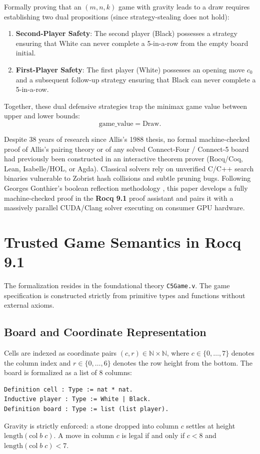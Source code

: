 \documentclass[11pt,reqno]{amsart}
\theoremstyle{plain}
\theoremstyle{definition}
\theoremstyle{remark}
\begin{document}
Formally proving that an $(m, n, k)$ game with gravity leads to a draw requires establishing two dual propositions (since strategy-stealing does not hold):
\begin{enumerate}
    \item \textbf{Second-Player Safety}: The second player (Black) possesses a strategy ensuring that White can never complete a 5-in-a-row from the empty board $\text{initial}$.
    \item \textbf{First-Player Safety}: The first player (White) possesses an opening move $c_0$ and a subsequent follow-up strategy ensuring that Black can never complete a 5-in-a-row.
\end{enumerate}
Together, these dual defensive strategies trap the minimax game value between upper and lower bounds:
\begin{equation}
\label{eq:game_value_draw}
\text{game\_value} = \text{Draw}.
\end{equation}

Despite 38 years of research since Allis's 1988 thesis, no formal machine-checked proof of Allis's pairing theory or of any solved Connect-Four / Connect-5 board had previously been constructed in an interactive theorem prover (Rocq/Coq, Lean, Isabelle/HOL, or Agda). Classical solvers rely on unverified C/C++ search binaries vulnerable to Zobrist hash collisions and subtle pruning bugs. Following Georges Gonthier's boolean reflection methodology \cite{gonthier2008formal}, this paper develops a fully machine-checked proof in the \textbf{Rocq 9.1} proof assistant and pairs it with a massively parallel CUDA/Clang solver executing on consumer GPU hardware.

\section{Trusted Game Semantics in Rocq 9.1}

The formalization resides in the foundational theory \texttt{C5Game.v}. The game specification is constructed strictly from primitive types and functions without external axioms.

\subsection{Board and Coordinate Representation}
Cells are indexed as coordinate pairs $(c, r) \in \mathbb{N} \times \mathbb{N}$, where $c \in \{0, \dots, 7\}$ denotes the column index and $r \in \{0, \dots, 6\}$ denotes the row height from the bottom. The board is formalized as a list of 8 columns:
\begin{lstlisting}[language=Coq]
Definition cell : Type := nat * nat.
Inductive player : Type := White | Black.
Definition board : Type := list (list player).
\end{lstlisting}
Gravity is strictly enforced: a stone dropped into column $c$ settles at height $\text{length}(\text{col}\; b\; c)$. A move in column $c$ is legal if and only if $c < 8$ and $\text{length}(\text{col}\; b\; c) < 7$.
\end{document}
